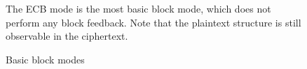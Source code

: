 \begin{figure}
  \begin{footnotesize}
    The ECB mode is the most basic block mode, which does not perform any block feedback. Note that the plaintext structure is still observable in the ciphertext.
  \end{footnotesize}

  \caption{Basic block modes}
  \label{figure/block-modes}
\end{figure}
